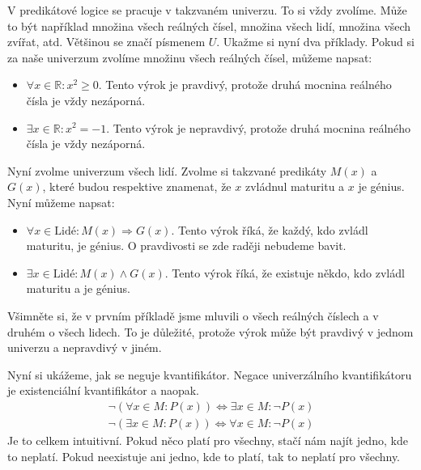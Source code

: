 \begin{example}
  V predikátové logice se pracuje v takzvaném univerzu. To si vždy zvolíme. Může to být například množina všech reálných čísel, množina všech lidí, množina všech zvířat, atd. Většinou se značí písmenem $U$. Ukažme si nyní dva příklady. Pokud si za naše univerzum zvolíme množinu všech reálných čísel, můžeme napsat:
  \begin{itemize}
    \item $\forall x \in \mathbb{R}: x^2 \geq 0$. Tento výrok je pravdivý, protože druhá mocnina reálného čísla je vždy nezáporná.
    \item $\exists x \in \mathbb{R}: x^2 = -1$. Tento výrok je nepravdivý, protože druhá mocnina reálného čísla je vždy nezáporná.  
  \end{itemize}
  Nyní zvolme univerzum všech lidí. Zvolme si takzvané predikáty $M(x)$ a $G(x)$, které budou respektive znamenat, že $x$ zvládnul maturitu a $x$ je génius. Nyní můžeme napsat:
  \begin{itemize}
    \item $\forall x \in \text{Lidé}: M(x) \Rightarrow G(x)$. Tento výrok říká, že každý, kdo zvládl maturitu, je génius. O pravdivosti se zde raději nebudeme bavit.
    \item $\exists x \in \text{Lidé}: M(x) \land G(x)$. Tento výrok říká, že existuje někdo, kdo zvládl maturitu a je génius.
  \end{itemize}

  Všimněte si, že v prvním příkladě jsme mluvili o všech reálných číslech a v druhém o všech lidech. To je důležité, protože výrok může být pravdivý v jednom univerzu a nepravdivý v jiném.

  \begin{definitionbox}
    Nyní si ukážeme, jak se neguje kvantifikátor. Negace univerzálního kvantifikátoru je existenciální kvantifikátor a naopak.
  \begin{equation}
    \begin{aligned}
      \neg (\forall x \in M: P(x)) \Leftrightarrow \exists x \in M: \neg P(x) \\
      \neg (\exists x \in M: P(x)) \Leftrightarrow \forall x \in M: \neg P(x)  
    \end{aligned}
  \end{equation}
  Je to celkem intuitivní. Pokud něco platí pro všechny, stačí nám najít jedno, kde to neplatí. Pokud neexistuje ani jedno, kde to platí, tak to neplatí pro všechny.
  \end{definitionbox}
\end{example}

